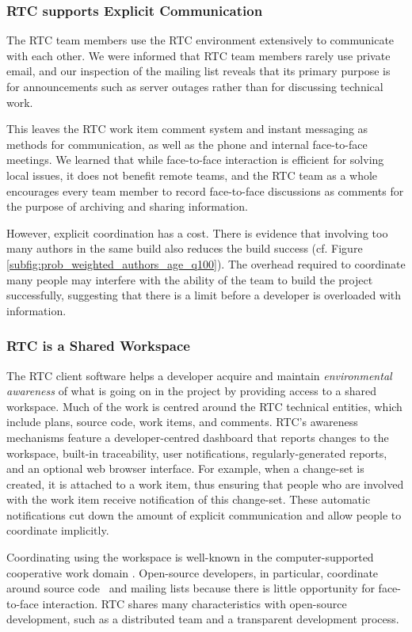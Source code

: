 \subsubsection{RTC supports Explicit Communication}
The RTC team members use the RTC environment extensively to communicate with each other. We were informed that RTC team members rarely use private email, and our inspection of the mailing list reveals that its primary purpose is for announcements such as server outages rather than for discussing technical work.

This leaves the RTC work item comment system and instant messaging as methods for communication, as well as the phone and internal face-to-face meetings.
We learned that while face-to-face interaction is efficient for solving local issues, it does not benefit remote teams, and the RTC team as a whole encourages every team member to record face-to-face discussions as comments for the purpose of archiving and sharing information.

However, explicit coordination has a cost. There is evidence that involving too many authors in the same build also reduces the build success (cf. Figure \ref{subfig:prob_weighted_authors_age_q100}). The overhead required to coordinate many people may interfere with the ability of the team to build the project successfully, suggesting that there is a limit before a developer is overloaded with information.

\subsubsection{RTC is a Shared Workspace}
The RTC client software helps a developer acquire and maintain \emph{environmental awareness} of what is going on in the project by providing access to a shared workspace. Much of the work is centred around the RTC technical entities, which include plans, source code, work items, and comments.
RTC's awareness mechanisms feature a developer-centred dashboard that reports changes to the workspace, built-in traceability, user notifications, regularly-generated reports, and an optional web browser interface. For example, when a change-set is created, it is attached to a work item, thus ensuring that people who are involved with the work item receive notification of this change-set. These automatic notifications cut down the amount of explicit communication and allow people to coordinate implicitly.

Coordinating using the workspace is well-known in the computer-supported cooperative work domain \cite{schmidt1996}. Open-source developers, in particular, coordinate around source code~\cite{bolici:stc:2009} and mailing lists \cite{gutwin2004:awareness,mockus2002:opensource} because there is little opportunity for face-to-face interaction. RTC shares many characteristics with open-source development, such as a distributed team and a transparent development process.


